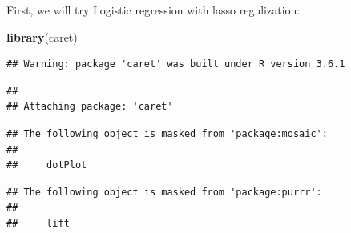 \documentclass[]{article}
\newenvironment{Shaded}{\begin{snugshade}}{\end{snugshade}}
\newcommand{\KeywordTok}[1]{\textcolor[rgb]{0.13,0.29,0.53}{\textbf{#1}}}
\newcommand{\NormalTok}[1]{#1}
\begin{document}
First, we will try Logistic regression with lasso regulization:

\begin{Shaded}
\begin{Highlighting}[]
\KeywordTok{library}\NormalTok{(caret)}
\end{Highlighting}
\end{Shaded}

\begin{verbatim}
## Warning: package 'caret' was built under R version 3.6.1
\end{verbatim}

\begin{verbatim}
## 
## Attaching package: 'caret'
\end{verbatim}

\begin{verbatim}
## The following object is masked from 'package:mosaic':
## 
##     dotPlot
\end{verbatim}

\begin{verbatim}
## The following object is masked from 'package:purrr':
## 
##     lift
\end{verbatim}
\end{document}
